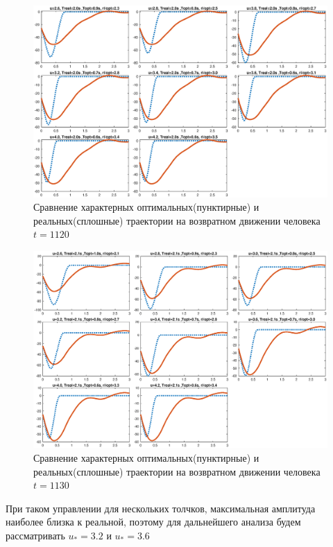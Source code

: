 \documentclass[a4paper,12pt, openany]{book}
\theoremstyle{plain} %
\theoremstyle{definition} %
\theoremstyle{remark} %
\numberwithin{equation}{chapter}
\begin{document}
{\begin{figure}[h!]
    \centering
    \includegraphics[width=1\linewidth]{final_graphs.eps}
    \caption{Сравнение характерных оптимальных(пунктирные) и реальных(сплошные) траектории на возвратном движении человека $t=1120$}
    \label{final_graphs}
\end{figure}

\begin{figure}[h!]
    \centering
    \includegraphics[width=1\linewidth]{final_graphs_1.eps}
    \caption{Сравнение характерных оптимальных(пунктирные) и реальных(сплошные) траектории на возвратном движении человека $t=1130$}
    \label{final_graphs_1}
\end{figure}

При таком управлении для нескольких толчков, максимальная амплитуда наиболее близка к реальной, поэтому для дальнейшего анализа будем рассматривать $u_*=3.2$ и $u_*=3.6$


}
\end{document}
